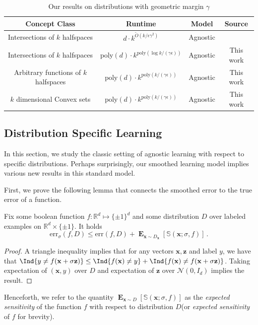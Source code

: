 \documentclass{theoretics}
\renewcommand\vec[1]{\mathbf{#1}}
\DeclareMathOperator*{\E}{\mathbf{E}}
\newcommand{\err}{\mathrm{err}}
\newcommand{\R}{\mathbb{R}}
\newcommand{\poly}{\mathrm{poly}}
\newcommand{\1}{\Ind}
\newcommand{\x}{\vec x}
\newcommand{\z}{\vec z}
\newcommand{\Gauss}{\mathcal{N}}
\begin{document}
\begin{table}[ht]
\centering
\begin{tabular}{|c|c|c|c|}
\hline
Concept Class & Runtime & Model & Source \\
\hline
\hline

Intersections  of $k$ halfspaces  & $d\cdot k^{\tilde{O}(k/\epsilon\gamma^2)}$ & Agnostic & \cite{ArriagaVempala:99}\\
\hline
Intersections of $k$ halfspaces & $\poly(d)\cdot k^{\poly(\log k/(\gamma\epsilon))}$ & Agnostic & This work \\
\hline

Arbitrary functions of $k$ halfspaces & $\poly(d)\cdot k^{\poly(k/(\gamma\epsilon))}$ & Agnostic & This work \\
\hline
$k$ dimensional Convex sets  & $\poly(d)\cdot k^{\poly(k/(\gamma\epsilon))}$ & Agnostic & This work \\
\hline
\end{tabular}
\caption{Our results on distributions with geometric margin $\gamma$}
\label{tab:margin}
\end{table}




\subsection{Distribution Specific Learning} 
In this section, we study the classic setting of agnostic learning with respect to specific distributions. Perhaps surprisingly, our smoothed learning model implies various new results in this standard model. 

First, we prove the following lemma that connects the smoothed error to the true error of a function.
\begin{lemma}
\label{obs:agnostic_to_smooth}
Fix some boolean function $f:\R^d\mapsto \{\pm 1\}^d$ and some distribution $D$ over labeled
examples on $\R^d \times \{ \pm 1\}$.
It holds
\[
        \err_\sigma(f,D)
        \leq 
         \err(f,D) 
         + \E_{\x\sim D_{\x}}
         [\mathbb S(\x;\sigma, f)]
         \,.
\]
\end{lemma}
\begin{proof}
    A triangle inequality implies that for any vectors $\x,\z$ and label $y$, we have that $\1\{y\neq f(\x+\sigma\z)\}\leq \1\{f(\x)\neq y\}+\1\{f(\x)\neq f(\x+\sigma\z)\} $. Taking expectation of $(\x,y)$ over $D$ and expectation of $\z$ over $\Gauss(0,I_d)$ implies the result.
\end{proof}
Henceforth, we refer to the quantity $\E_{\x\sim D}[\mathbb{S}(\x;\sigma,f)]$ as the \textit{expected sensitivity} of the function $f$ with respect to distribution $D$(or \textit{expected sensitivity} of $f$ for brevity).
\end{document}
